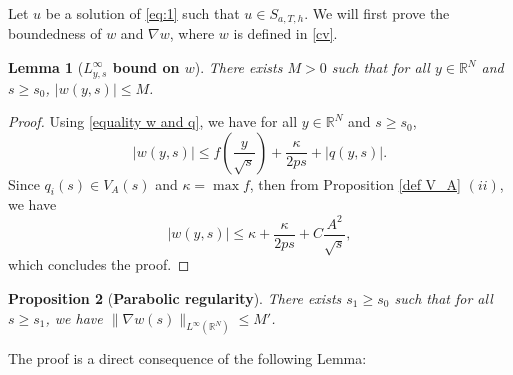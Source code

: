 \documentclass[11pt,a4paper]{article}
\newcommand{\1}{\mathbbm{1}}
\numberwithin{equation}{section}
\newcommand{\numberset}{\mathbb}
\newcommand{\R}{\numberset{R}}
\newtheorem{lemma}{Lemma}[section]
\newtheorem{prp}[lemma]{Proposition}
\theoremstyle{remark}
\begin{document}
Let $u$ be a solution of \eqref{eq:1} such that $u\in S_{a,T,h}$. We will first prove the boundedness of $w$ and $\nabla w$, where $w$ is defined in \eqref{cv}.
\begin{lemma}[\textbf{$L^\infty_{y,s}$ bound on $w$}]\label{bound w}
There exists $M>0$ such that for all $y\in \R^N$ and $s\geq s_0$, $| w(y,s)|\leq M$.
\end{lemma}
\begin{proof}
Using \eqref{equality w and q}, we have for all $y\in \R^N$ and $s\geq s_0$,
$$|w(y,s)|\leq f\left(\frac{y}{\sqrt{s}}\right)+\frac{\kappa}{2ps}+|q(y,s)|.$$
Since $q_i(s)\in V_A(s)$ and $\kappa=\max f$, then from Proposition \ref{def V_A} $(ii)$, we have
$$|w(y,s)|\leq \kappa+\frac{\kappa}{2ps}+C\frac{A^2}{\sqrt{s}},$$
which concludes the proof.
\end{proof}

\begin{prp}[\textbf{Parabolic regularity}]\label{bound nabla w}
There exists $s_1\geq s_0$ such that for all $s\geq s_1$, we have $\|\nabla w(s)\|_{L^\infty(\R^N)}\leq M'$.
\end{prp}
The proof is a direct consequence of the following Lemma:
\end{document}
